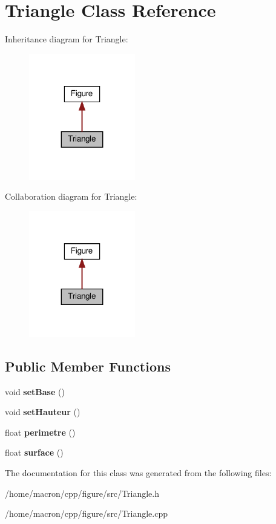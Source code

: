 \hypertarget{classTriangle}{}\section{Triangle Class Reference}
\label{classTriangle}


Inheritance diagram for Triangle\+:
\nopagebreak
\begin{figure}[H]
\begin{center}
\leavevmode
\includegraphics[width=131pt]{classTriangle__inherit__graph}
\end{center}
\end{figure}


Collaboration diagram for Triangle\+:
\nopagebreak
\begin{figure}[H]
\begin{center}
\leavevmode
\includegraphics[width=131pt]{classTriangle__coll__graph}
\end{center}
\end{figure}
\subsection*{Public Member Functions}
\begin{DoxyCompactItemize}
\item 
\mbox{\label{classTriangle_a7c7f471befc770547cc00677a42b7b72}} 
void {\bfseries set\+Base} ()
\item 
\mbox{\label{classTriangle_ae84e07501830b6da3113ebc7c1a5ac8b}} 
void {\bfseries set\+Hauteur} ()
\item 
\mbox{\label{classTriangle_a4ebfa1b94dbb6eb0eb1bc437cefad3a2}} 
float {\bfseries perimetre} ()
\item 
\mbox{\label{classTriangle_adcc6c150141934d6d53db85bcca93958}} 
float {\bfseries surface} ()
\end{DoxyCompactItemize}


The documentation for this class was generated from the following files\+:\begin{DoxyCompactItemize}
\item 
/home/macron/cpp/figure/src/Triangle.\+h\item 
/home/macron/cpp/figure/src/Triangle.\+cpp\end{DoxyCompactItemize}
